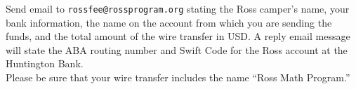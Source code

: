 \documentclass[11pt]{ross}
\begin{document}
Send email to \texttt{rossfee@rossprogram.org} stating the Ross camper's name, your
bank information, the name on the account from which you are sending
the funds, and the total amount of the wire transfer in USD. A reply email message will 
state the ABA routing number and Swift Code for the Ross account at the Huntington Bank.\\
 \hspace*{1cm} Please be sure that your wire transfer includes the name ``Ross Math Program.''  

\begin{comment}
Here is the bank information for electronic transfers:

\begin{tabular}{ll}
\textbf{Bank Name:} & HUNTINGTON NATIONAL BANK N.A.\\
  & Some Street \\
  & Columbus, OH 43215 \\
\textbf{ABA routing number:} &   wire transfers only \\
 &  ACH only  \\
\textbf{Swift Code (International):} & HUNTINGTON CODE \\
\textbf{Bank Account Name:} & ROSS MATHEMATICS FOUNDATION \\
\textbf{Account Number:} &  980000975 \\
  \textbf{Additional Information:} &  Ross Math Program Jim Fowler 773-809-5659 \\
\end{tabular}

\end{comment}
\end{document}
